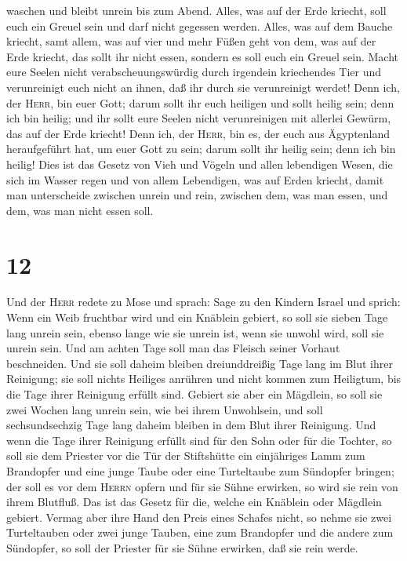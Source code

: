 waschen und bleibt unrein bis zum Abend.  Alles, was auf
der Erde kriecht, soll euch ein Greuel sein und darf nicht gegessen
werden.  Alles, was auf dem Bauche kriecht, samt allem,
was auf vier und mehr Füßen geht von dem, was auf der Erde kriecht, das
sollt ihr nicht essen, sondern es soll euch ein Greuel sein.
 Macht eure Seelen nicht verabscheuungswürdig durch
irgendein kriechendes Tier und verunreinigt euch nicht an ihnen, daß ihr
durch sie verunreinigt werdet!  Denn ich, der
\textsc{Herr}, bin euer Gott; darum sollt ihr euch heiligen und sollt
heilig sein; denn ich bin heilig; und ihr sollt eure Seelen nicht
verunreinigen mit allerlei Gewürm, das auf der Erde kriecht!
 Denn ich, der \textsc{Herr}, bin es, der euch aus
Ägyptenland heraufgeführt hat, um euer Gott zu sein; darum sollt ihr
heilig sein; denn ich bin heilig!  Dies ist das Gesetz
von Vieh und Vögeln und allen lebendigen Wesen, die sich im Wasser regen
und von allem Lebendigen, was auf Erden kriecht,  damit
man unterscheide zwischen unrein und rein, zwischen dem, was man essen,
und dem, was man nicht essen soll.

\hypertarget{section-11}{%
\section{12}\label{section-11}}

 Und der \textsc{Herr} redete zu Mose und sprach: Sage zu
den Kindern Israel und sprich:  Wenn ein Weib fruchtbar
wird und ein Knäblein gebiert, so soll sie sieben Tage lang unrein sein,
ebenso lange wie sie unrein ist, wenn sie unwohl wird, soll sie unrein
sein.  Und am achten Tage soll man das Fleisch seiner
Vorhaut beschneiden.  Und sie soll daheim bleiben
dreiunddreißig Tage lang im Blut ihrer Reinigung; sie soll nichts
Heiliges anrühren und nicht kommen zum Heiligtum, bis die Tage ihrer
Reinigung erfüllt sind.  Gebiert sie aber ein Mägdlein, so
soll sie zwei Wochen lang unrein sein, wie bei ihrem Unwohlsein, und
soll sechsundsechzig Tage lang daheim bleiben in dem Blut ihrer
Reinigung.  Und wenn die Tage ihrer Reinigung erfüllt sind
für den Sohn oder für die Tochter, so soll sie dem Priester vor die Tür
der Stiftshütte ein einjähriges Lamm zum Brandopfer und eine junge Taube
oder eine Turteltaube zum Sündopfer bringen;  der soll es
vor dem \textsc{Herrn} opfern und für sie Sühne erwirken, so wird sie
rein von ihrem Blutfluß. Das ist das Gesetz für die, welche ein Knäblein
oder Mägdlein gebiert.  Vermag aber ihre Hand den Preis
eines Schafes nicht, so nehme sie zwei Turteltauben oder zwei junge
Tauben, eine zum Brandopfer und die andere zum Sündopfer, so soll der
Priester für sie Sühne erwirken, daß sie rein werde.

